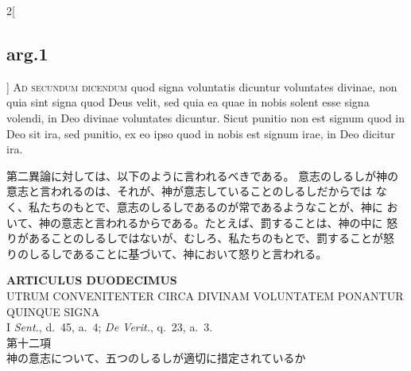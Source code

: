 \documentclass[paper=a4paper,fontsize=10pt,jafontsize=9pt,titlepage]{jlreq}
\begin{document}
\begin{paracol}{2}[\subsection{arg.1}]
{\scshape Ad secundum dicendum} quod signa voluntatis
dicuntur voluntates divinae, non quia sint signa quod Deus velit, sed
quia ea quae in nobis solent esse signa volendi, in Deo divinae
voluntates dicuntur. Sicut punitio non est signum quod in Deo sit ira,
sed punitio, ex eo ipso quod in nobis est signum irae, in Deo dicitur
ira.

\switchcolumn

第二異論に対しては、以下のように言われるべきである。
意志のしるしが神の意志と言われるのは、それが、神が意志していることのしるしだからでは
 なく、私たちのもとで、意志のしるしであるのが常であるようなことが、神に
 おいて、神の意志と言われるからである。たとえば、罰することは、神の中に
 怒りがあることのしるしではないが、むしろ、私たちのもとで、罰することが怒
 りのしるしであることに基づいて、神において怒りと言われる。

\end{paracol}
\newpage





{}
\setcounter{section}{12}
\setcounter{subsection}{0}
\begin{center}
 {\Large {\bfseries ARTICULUS DUODECIMUS}}\\
 {\large UTRUM CONVENITENTER CIRCA DIVINAM VOLUNTATEM PONANTUR QUINQUE SIGNA}\\
 {\footnotesize I {\itshape Sent.}, d.~45, a.~4; {\itshape De Verit.},
 q.~23, a.~3.}\\
 {\Large 第十二項\\神の意志について、五つのしるしが適切に措定されているか}
\end{center}
\end{document}
